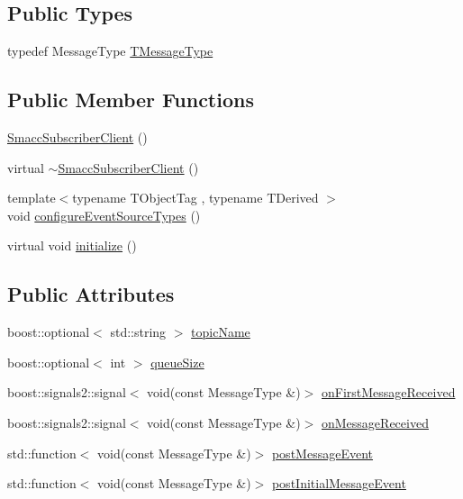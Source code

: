 \subsection*{Public Types}
\begin{DoxyCompactItemize}
\item 
typedef Message\+Type \hyperlink{classsmacc_1_1SmaccSubscriberClient_ae0666debefce5c0e7b355ded711ffa79}{T\+Message\+Type}
\end{DoxyCompactItemize}
\subsection*{Public Member Functions}
\begin{DoxyCompactItemize}
\item 
\hyperlink{classsmacc_1_1SmaccSubscriberClient_a864c5e7a7d267428e971d39b08a75066}{Smacc\+Subscriber\+Client} ()
\item 
virtual \hyperlink{classsmacc_1_1SmaccSubscriberClient_a1cff9c8ba162decf72b951c9e3459b7c}{$\sim$\+Smacc\+Subscriber\+Client} ()
\item 
{\footnotesize template$<$typename T\+Object\+Tag , typename T\+Derived $>$ }\\void \hyperlink{classsmacc_1_1SmaccSubscriberClient_a6bf5d364bc7dc89c4e2ff4796c8e4b63}{configure\+Event\+Source\+Types} ()
\item 
virtual void \hyperlink{classsmacc_1_1SmaccSubscriberClient_acfa97685ecc588fe61eb57002354b58a}{initialize} ()
\end{DoxyCompactItemize}
\subsection*{Public Attributes}
\begin{DoxyCompactItemize}
\item 
boost\+::optional$<$ std\+::string $>$ \hyperlink{classsmacc_1_1SmaccSubscriberClient_ac062907e834aa8e4ca7964fe2035edf7}{topic\+Name}
\item 
boost\+::optional$<$ int $>$ \hyperlink{classsmacc_1_1SmaccSubscriberClient_ac8d4905509ecacb7c93d72c9acb9b6a1}{queue\+Size}
\item 
boost\+::signals2\+::signal$<$ void(const Message\+Type \&)$>$ \hyperlink{classsmacc_1_1SmaccSubscriberClient_a2927ee2e390f12000379c9f48ddb7695}{on\+First\+Message\+Received}
\item 
boost\+::signals2\+::signal$<$ void(const Message\+Type \&)$>$ \hyperlink{classsmacc_1_1SmaccSubscriberClient_a7635fbb013c6fdbc3998da11b44766bb}{on\+Message\+Received}
\item 
std\+::function$<$ void(const Message\+Type \&)$>$ \hyperlink{classsmacc_1_1SmaccSubscriberClient_ac131b24d58ff06791068f8dfd3401a0b}{post\+Message\+Event}
\item 
std\+::function$<$ void(const Message\+Type \&)$>$ \hyperlink{classsmacc_1_1SmaccSubscriberClient_aeec34b082c687a24a89942aca44575cc}{post\+Initial\+Message\+Event}
\end{DoxyCompactItemize}

